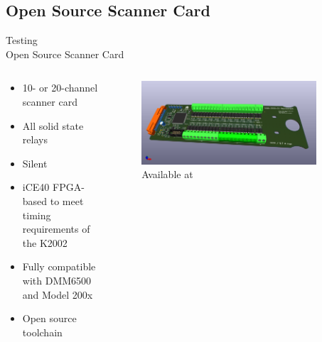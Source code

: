 \documentclass[color={accentcolor=1b}, authorontitle=true]{tudabeamer}
\begin{document}
\subsection{Open Source Scanner Card}
\begin{frame}{Testing \\\textnormal{\small{Open Source Scanner Card}}}
    \begin{columns}[T] %
        \begin{column}{.48\textwidth}
            \begin{itemize}
                \item 10- or 20-channel scanner card
                \item All solid state relays
                \item Silent
                \item iCE40 FPGA-based to meet timing requirements of the K2002
                \item Fully compatible with DMM6500 and Model 200x
                \item Open source toolchain
            \end{itemize}

        \end{column}
        \hfill
        \begin{column}{.48\textwidth}
            \begin{figure}[h]
                \includegraphics[width=0.9\textwidth]{images/scanner_card.png}
                \caption{Available at \cite{scan2000}}
            \end{figure}
        \end{column}
    \end{columns}
\end{frame}
\end{document}
